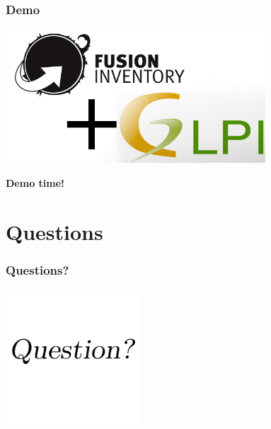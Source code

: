 \documentclass{beamer}
\begin{document}

\begin{frame}
    \frametitle{Demo}

   \includegraphics[height=5cm]{./pics/fusinvglpi.png}

    \bf{Demo time!}
\end{frame}

\section{Questions}

\begin{frame}
    \frametitle{Questions?}

    \begin{center}

    \includegraphics[height=5cm]{./pics/question.pdf}

    \end{center}
    
\end{frame}
\end{document}
